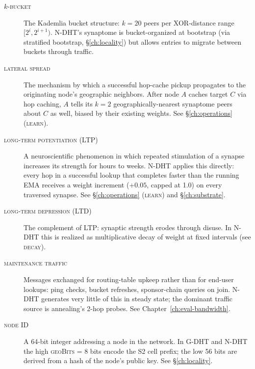 \documentclass[twoside,nobib]{tufte-book}
\newcommand{\NDHT}{N-DHT\xspace}
\newcommand{\GDHT}{G-DHT\xspace}
\begin{document}
\begin{description}
\item[\textsc{$k$-bucket}]
The Kademlia bucket structure: $k = 20$ peers per XOR-distance
range $[2^i, 2^{i+1})$. \NDHT's synaptome is bucket-organized at
bootstrap (via stratified bootstrap, \S\ref{ch:locality}) but
allows entries to migrate between buckets through traffic.

\item[\textsc{lateral spread}]
The mechanism by which a successful hop-cache pickup propagates to
the originating node's geographic neighbors. After node $A$ caches
target $C$ via hop caching, $A$ tells its $k = 2$
geographically-nearest synaptome peers about $C$ as well, biased
by their existing weights. See \S\ref{ch:operations} (\textsc{learn}).

\item[\textsc{long-term potentiation (LTP)}]
A neuroscientific phenomenon in which repeated stimulation of a
synapse increases its strength for hours to weeks. \NDHT applies
this directly: every hop in a successful lookup that completes
faster than the running EMA receives a weight increment ($+0.05$,
capped at 1.0) on every traversed synapse. See
\S\ref{ch:operations} (\textsc{learn}) and \S\ref{ch:substrate}.

\item[\textsc{long-term depression (LTD)}]
The complement of LTP: synaptic strength erodes through disuse.
In \NDHT this is realized as multiplicative decay of weight at
fixed intervals (see \textsc{decay}).

\item[\textsc{maintenance traffic}]
Messages exchanged for routing-table upkeep rather than for
end-user lookups: ping checks, bucket refreshes, sponsor-chain
queries on join. \NDHT generates very little of this in steady
state; the dominant traffic source is annealing's 2-hop probes.
See Chapter~\ref{ch:eval-bandwidth}.

\item[\textsc{node ID}]
A 64-bit integer addressing a node in the network. In \GDHT and
\NDHT the high \textsc{geoBits} = 8 bits encode the S2 cell
prefix; the low 56 bits are derived from a hash of the node's
public key. See \S\ref{ch:locality}.


\end{description}
\end{document}
